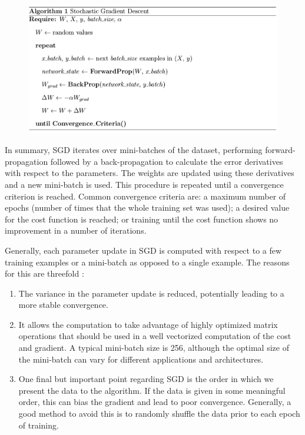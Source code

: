 \begin{figure}[H]
	\centering
	{\includegraphics[width=1\textwidth]{images/sgd}}
	\label{fig:sgd}
\end{figure}
In summary, SGD iterates over mini-batches of the dataset, performing forward-propagation followed by a back-propagation to calculate the error derivatives with respect to the parameters. The weights are updated using these derivatives and a new mini-batch is used. This procedure is repeated until a convergence criterion is reached. Common convergence criteria are: a maximum number of epochs (number of times that the whole training set was used); a desired value for the cost function is reached; or training until the cost function shows no improvement in a number of iterations.

Generally, each parameter update in SGD is computed with respect to a few training examples or a mini-batch as opposed to a single example. The reasons for this are threefold \cite{sgd}:
\begin{enumerate}
	\item The variance in the parameter update is reduced, potentially leading to a more stable convergence. 
	\item It allows the computation to take advantage of highly optimized matrix operations that should be used in a well vectorized computation of the cost and gradient.  A typical mini-batch size is 256, although the optimal size of the mini-batch can vary for different applications and architectures.
	\item One final but important point regarding SGD is the order in which we present the data to the algorithm. If the data is given in some meaningful order, this can bias the gradient and lead to poor convergence. Generally, a good method to avoid this is to randomly shuffle the data prior to each epoch of training.
\end{enumerate}


